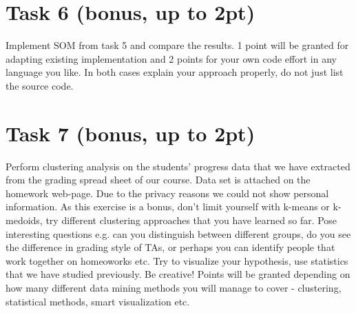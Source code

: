 \documentclass{article}
\begin{document}
\section*{Task 6 (bonus, up to 2pt)}
Implement SOM from task 5 and compare the results. 1 point will be granted for adapting existing implementation and 2 points for your own code effort in any language you like. In both cases explain your approach properly, do not just list the source code. 

\section*{Task 7 (bonus, up to 2pt)}
Perform clustering analysis on the students' progress data that we have extracted from the grading spread sheet of our course. Data set is attached on the homework web-page. Due to the privacy reasons we could not show personal information. As this exercise is a bonus, don't limit yourself with k-means or k-medoids, try different clustering approaches that you have learned so far. 
Pose interesting questions e.g. can you distinguish between different groups, do you see the difference in grading style of TAs, or perhaps you can identify people that work together on homeoworks etc. Try to visualize your hypothesis, use statistics that we have studied previously. Be creative!
Points will be granted depending on how many different data mining methods you will manage to cover - clustering, statistical methods, smart visualization etc. 
\end{document}
